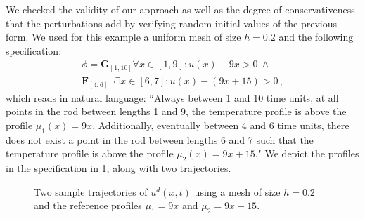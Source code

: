 \documentclass[letterpaper, 10 pt, conference]{ieeeconf/ieeeconf}
\newcommand{\Always}{\mathbf{G}}
\newcommand{\Event}{\mathbf{F}}
\begin{document}
We checked the validity of our approach as well as the degree of
conservativeness that the perturbations add by verifying random initial values
of the previous form. We used for this example a uniform mesh of size $h = 0.2$
and the following specification: 
%
\begin{multline}
        \phi = \Always_{[1, 10]} \forall x \in [1, 9]: u(x) - 9x > 0 \ \land \\
        \Event_{[4, 6]} \lnot \exists x \in [6, 7]: u(x) - (9x + 15) > 0 \,,
\end{multline}
%
which reads in natural language: ``Always between 1 and 10 time units, at all
points in the rod between lengths 1 and 9, the temperature profile is above the
profile $\mu_1(x) = 9x$. Additionally, eventually between 4 and 6 time units,
there does not exist a point in the rod between lengths 6 and 7 such that the
temperature profile is above the profile $\mu_2(x) = 9x + 15$." We depict the
profiles in the specification in \cref{fig:ex2_evolution}, along with two
trajectories.

\begin{figure}[!t]
    \centering 
        \hfill
        \hfill
        \caption{Two sample trajectories of $u^d(x, t)$ using a mesh of size
        $h=0.2$ and the reference profiles $\mu_1 = 9x$ and $\mu_2 = 9x + 15$.}
    \label{fig:ex2_evolution}
\end{figure}
\end{document}

